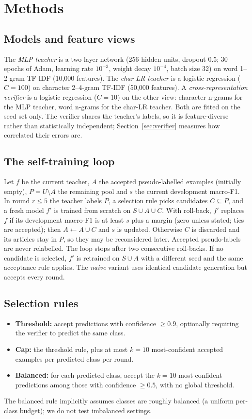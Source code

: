 \documentclass[11pt]{article}
\begin{document}
\section{Methods}
\subsection{Models and feature views}
The \emph{MLP teacher} is a two-layer network (256 hidden units, dropout 0.5; 30 epochs of Adam, learning rate $10^{-3}$, weight decay $10^{-4}$, batch size 32) on word 1--2-gram TF-IDF (10{,}000 features). The \emph{char-LR teacher} is a logistic regression ($C=100$) on character 2--4-gram TF-IDF (50{,}000 features). A \emph{cross-representation verifier} is a logistic regression ($C=10$) on the other view: character n-grams for the MLP teacher, word n-grams for the char-LR teacher. Both are fitted on the seed set only. The verifier shares the teacher's labels, so it is feature-diverse rather than statistically independent; Section~\ref{sec:verifier} measures how correlated their errors are.

\subsection{The self-training loop}
Let $f$ be the current teacher, $A$ the accepted pseudo-labelled examples (initially empty), $P=U\setminus A$ the remaining pool and $s$ the current development macro-F1. In round $r\le 5$ the teacher labels $P$, a selection rule picks candidates $C\subseteq P$, and a fresh model $f'$ is trained from scratch on $S\cup A\cup C$. With roll-back, $f'$ replaces $f$ if its development macro-F1 is at least $s$ plus a margin (zero unless stated; ties are accepted); then $A\leftarrow A\cup C$ and $s$ is updated. Otherwise $C$ is discarded and its articles stay in $P$, so they may be reconsidered later. Accepted pseudo-labels are never relabelled. The loop stops after two consecutive roll-backs. If no candidate is selected, $f'$ is retrained on $S\cup A$ with a different seed and the same acceptance rule applies. The \emph{naive} variant uses identical candidate generation but accepts every round.

\subsection{Selection rules}
\begin{itemize}
\item \textbf{Threshold:} accept predictions with confidence $\ge0.9$, optionally requiring the verifier to predict the same class.
\item \textbf{Cap:} the threshold rule, plus at most $k=10$ most-confident accepted examples per predicted class per round.
\item \textbf{Balanced:} for each predicted class, accept the $k=10$ most confident predictions among those with confidence $\ge0.5$, with no global threshold.
\end{itemize}
The balanced rule implicitly assumes classes are roughly balanced (a uniform per-class budget); we do not test imbalanced settings.
\end{document}
